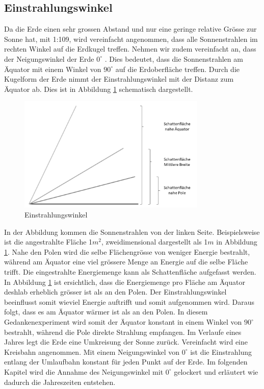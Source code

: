 \begin{refsection}
\section{Einstrahlungswinkel}\label{sec:winkel} 
Da die Erde einen sehr grossen Abstand und nur eine geringe relative Grösse zur Sonne hat, mit 1:109, wird vereinfacht angenommen, dass alle Sonnenstrahlen im rechten Winkel auf die Erdkugel treffen. Nehmen wir zudem vereinfacht an, dass der Neigungswinkel der Erde $0^\circ$ . Dies bedeutet, dass die Sonnenstrahlen am Äquator mit einem Winkel von $90^\circ$ auf die Erdoberfläche treffen. Durch die Kugelform der Erde nimmt der Einstrahlungswinkel mit der Distanz zum Äquator ab. Dies ist in Abbildung \ref{fig:abb5} schematisch dargestellt. 
%
\begin{figure}
	\centering
	\includegraphics[width= 0.8\textwidth]{neigung/Schatten.png}
	\caption[Einstrahlungswinkel]{Einstrahlungswinkel}
	\label{fig:abb5}
\end{figure}
In der Abbildung kommen die Sonnenstrahlen von der linken Seite. Beispielsweise ist die angestrahlte Fläche 1$m^2$, zweidimensional dargestellt als 1$m$ in Abbildung \ref{fig:abb5}. Nahe den Polen wird die selbe Flächengrösse von weniger Energie bestrahlt, während am Äquator eine viel grössere Menge an Energie auf die selbe Fläche trifft. Die eingestrahlte Energiemenge kann als Schattenfläche aufgefasst werden. In Abbildung \ref{fig:abb5} ist ersichtlich, dass die Energiemenge pro Fläche am Äquator deshlab erheblich grösser ist als an den Polen. Der Einstrahlungswinkel beeinflusst somit wieviel Energie auftrifft und somit aufgenommen wird. Daraus folgt, dass es am Äquator wärmer ist als an den Polen. 
In diesem Gedankenexperiment wird somit der Äquator konstant in einem Winkel von $90^\circ$ bestrahlt, während die Pole direkte Strahlung empfangen. Im Verlaufe eines Jahres legt die Erde eine Umkreisung der Sonne zurück. Vereinfacht wird eine Kreisbahn angenommen. Mit einem Neigungswinkel von $0^\circ$ ist die Einstrahlung entlang der Umlaufbahn konstant für jeden Punkt auf der Erde. Im folgenden Kapitel wird die Annahme des Neigungswinkel mit $0^\circ$ gelockert und erläutert wie dadurch die Jahreszeiten entstehen.


\end{refsection}
